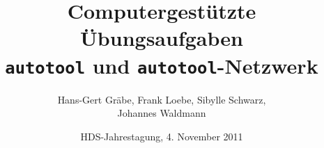 \usepackage{pgf,pgfarrows,pgfnodes,pgfautomata,pgfheaps}
\usepackage[german]{babel}
\usepackage[utf8]{inputenc}

\usepackage{times}




\title{Computergestützte Übungsaufgaben \\
  \texttt{autotool} und \texttt{autotool}-Netzwerk
}
\author{Hans-Gert Gräbe, Frank Loebe, Sibylle Schwarz, \\ Johannes Waldmann
}
\date{HDS-Jahrestagung, 4. November 2011}



\begin{frame}\titlepage\end{frame}











